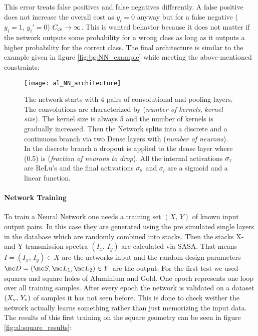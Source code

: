 \noindent
This error treats false positives and false negatives differently. A false positive does not increase the overall cost as $y_i = 0$ anyway but for a false negative ($y_i = 1, \, y_i' = 0$) $C_{\mathrm{ce}} \rightarrow \infty$. This is wanted behavior because it does not matter if the network outputs some probability for a wrong class as long as it outputs a higher probability for the correct class. The final architecture is similar to the example given in figure \ref{fig:bg:NN_example} while meeting the above-mentioned constraints:

\begin{figure}[H]
    \centering
    \texttt{[image: al\_NN\_architecture]}
    \caption{The network starts with 4 pairs of convolutional and pooling layers. The convolutions are characterized by (\textit{number of kernels}, \textit{kernel size}). The kernel size is always 5 and the number of kernels is gradually increased. Then the Network splits into a discrete and a continuous branch via two Dense layers with (\textit{number of neurons}). In the discrete branch a dropout is applied to the dense layer where (0.5) is (\textit{fraction of neurons to drop}).
    All the internal activations $\sigma_{\mathrm{r}}$ are ReLu's and the final activations $\sigma_{\mathrm{s}}$ and $\sigma_{l}$ are a sigmoid and a linear function.}
    \label{fig:al:NN_architecture}
\end{figure}

\newpage
\paragraph{Network Training}
To train a Neural Network one needs a training set $(X, \, Y)$ of known input output pairs. In this case they are generated using the pre simulated single layers in the database which are randomly combined into stacks. Then the stacks X- and Y-transmission spectra $(I_x, \, I_y)$ are calculated via SASA.
That means $I = (I_x, \, I_y) \in X$ are the networks input and the random design parameters ${\mc D = (\mc S, \mc L_1, \mc L_2) \in Y}$ are the output. For the first test we used squares and square holes of Aluminium and Gold. One epoch represents one loop over all training samples. After every epoch the network is validated on a dataset $(X_{\mathrm{v}}, \, Y_{\mathrm{v}})$ of samples it has not seen before. This is done to check weither the network actually learns something rather than just memorizing the input data.  The results of this first training on the square geometry can be seen in figure \ref{fig:al:square_results}:

